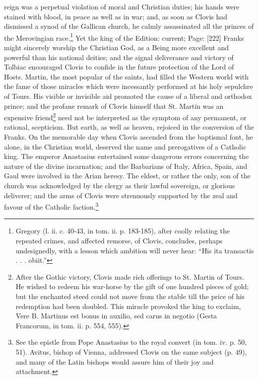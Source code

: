 reign was a perpetual violation of moral and Christian duties; his hands were stained with blood, in peace as well as in war; and, as soon as Clovis had dismissed a synod of the Gallican church, he calmly assassinated all the princes of the Merovingian race.\footnote{Gregory (l. ii. c. 40-43, in tom. ii. p. 183-185), after coolly relating the repeated crimes, and affected remorse, of Clovis, concludes, perhaps undesignedly, with a lesson which ambition will never hear: \texthebrew{“}His ita transactis . . . obiit.\texthebrew{}”} Yet the king of the Edition: current; Page: [222] Franks might sincerely worship the Christian God, as a Being more excellent and powerful than his national deities; and the signal deliverance and victory of Tolbiac encouraged Clovis to confide in the future protection of the Lord of Hosts. Martin, the most popular of the saints, had filled the Western world with the fame of those miracles which were incessantly performed at his holy sepulchre of Tours. His visible or invisible aid promoted the cause of a liberal and orthodox prince; and the profane remark of Clovis himself that St. Martin was an expensive friend\footnote{After the Gothic victory, Clovis made rich offerings to St. Martin of Tours. He wished to redeem his war-horse by the gift of one hundred pieces of gold; but the enchanted steed could not move from the stable till the price of his redemption had been doubled. This miracle provoked the king to exclaim, Vere B. Martinus est bonus in auxilio, sed carus in negotio (Gesta Francorum, in tom. ii. p. 554, 555).} need not be interpreted as the symptom of any permanent, or rational, scepticism. But earth, as well as heaven, rejoiced in the conversion of the Franks. On the memorable day when Clovis ascended from the baptismal font, he alone, in the Christian world, deserved the name and prerogatives of a Catholic king. The emperor Anastasius entertained some dangerous errors concerning the nature of the divine incarnation; and the Barbarians of Italy, Africa, Spain, and Gaul were involved in the Arian heresy. The eldest, or rather the only, son of the church was acknowledged by the clergy as their lawful sovereign, or glorious deliverer; and the arms of Clovis were strenuously supported by the zeal and favour of the Catholic faction.\footnote{See the epistle from Pope Anastasius to the royal convert (in tom. iv. p. 50, 51). Avitus, bishop of Vienna, addressed Clovis on the same subject (p. 49), and many of the Latin bishops would assure him of their joy and attachment.}

